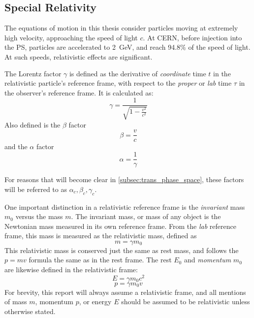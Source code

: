 \documentclass[11pt]{report}
\begin{document}
\subsection{Special Relativity}

The equations of motion in this thesis consider particles moving at extremely high velocity, approaching the speed of light $c$. At CERN, before injection into the PS, particles are accelerated to \qty{2}{\giga\electronvolt}, and reach 94.8\% of the speed of light. At such speeds, relativistic effects are significant.

The Lorentz factor $\gamma$ is defined as the derivative of \textit{coordinate} time $t$ in the relativistic particle's reference frame, with respect to the \textit{proper} or \textit{lab} time $\tau$ in the observer's reference frame. It is calculated as:
\begin{equation}
    \gamma = \frac 1{\sqrt{1-\frac{v^2}{c^2}}}
\end{equation}
Also defined is the $\beta$ factor
\begin{equation}
    \beta = \frac vc
\end{equation}
and the $\alpha$ factor
\begin{equation}
    \alpha = \frac 1\gamma
\end{equation}

For reasons that will become clear in \autoref{subsec:trans_phase_space}, these factors will be referred to as $\alpha_c, \beta_c, \gamma_c$.

One important distinction in a relativistic reference frame is the \textit{invariant} mass $m_0$ versus the  mass $m$. The invariant mass, or  mass of any object is the Newtonian mass measured in its own reference frame. From the \textit{lab} reference frame, this mass is measured as the relativistic mass, defined as
\begin{equation}
    m=\gamma m_0
\end{equation}
This relativistic mass is conserved just the same as rest mass, and follows the $p=mv$ formula the same as in the rest frame. 
The rest  $E_0$ and \textit{momentum} $m_0$ are likewise defined in the relativistic frame:
\begin{equation}
    E=\gamma m_0c^2
    \label{eq:relativistic_energy}
\end{equation}
\begin{equation}
    p=\gamma m_0v
    \label{eq:relativistic_momentum}
\end{equation}
For brevity, this report will always assume a relativistic frame, and all mentions of mass $m$, momentum $p$, or energy $E$ should be assumed to be relativistic unless otherwise stated.
\end{document}
